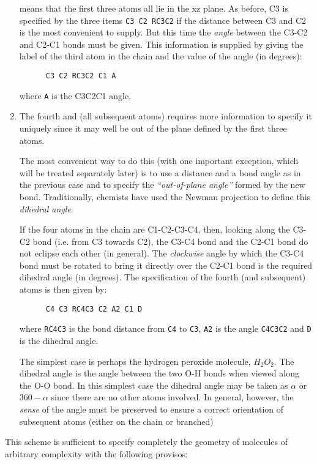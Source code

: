 \begin{enumerate}
means that the first three atoms all lie in the xz plane.
As before, C3 is specified by the three items {\tt C3 C2 RC3C2}
if the distance between C3 and C2 is the most convenient to supply.
But this time the {\em angle} between the C3-C2 and C2-C1 bonds must be
given. This information is supplied by giving the label of the
third atom in the chain and the value of the angle (in degrees):
\begin{verbatim}
      C3 C2 RC3C2 C1 A
\end{verbatim}
where {\tt A} is the C3C2C1 angle.
\item The fourth and (all subsequent atoms) requires more information
to specify it uniquely since it may well be out of the plane defined
by the first three atoms. 

The most convenient way to do this (with one important exception, which
will be treated separately later) is to use a distance and a bond angle
as in the previous case and to specify the {\em ``out-of-plane
angle''} formed by the new bond. Traditionally, chemists have used
the Newman projection to define this {\em dihedral angle}.

If the four atoms in the chain are C1-C2-C3-C4, then, looking along
the C3-C2 bond (i.e. from C3 towards C2), the C3-C4 bond and the C2-C1
bond do not eclipse each other (in general). The {\em clockwise}
angle by which the C3-C4 bond must be rotated to bring it directly over the
C2-C1 bond is the required dihedral angle (in degrees). 
The specification of the fourth (and subsequent) atoms is then given
by:
\begin{verbatim}
      C4 C3 RC4C3 C2 A2 C1 D
\end{verbatim}
where {\tt RC4C3} is the bond distance from {\tt C4} to {\tt C3},
{\tt A2} is the angle {\tt C4C3C2} and {\tt D}
is the dihedral angle.

The simplest case is
perhaps the hydrogen peroxide molecule, $H_2 O_2$. The dihedral
angle is the angle between the two O-H bonds when viewed along the O-O
bond. In this simplest case the dihedral angle may be taken as
$\alpha$ or $360 - \alpha$ since there are no other atoms involved.
In general, however, the {\em sense} of the angle must be preserved to
ensure a correct orientation of subsequent atoms (either on the chain
or branched)
\end{enumerate}
This scheme is sufficient to specify completely the geometry
of molecules of arbitrary complexity with the following provisos:
